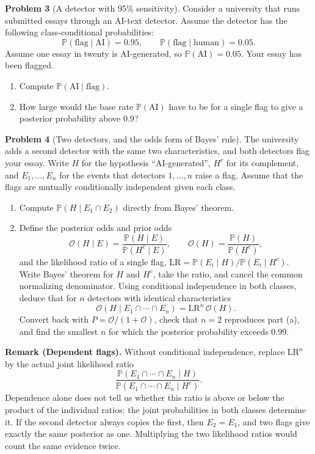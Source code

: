 \documentclass[11pt,a4paper]{article}
\newcommand{\Prob}{\mathbb P}
\newcommand{\problem}[2]{\par\addvspace{6pt}\textbf{Problem #1} (#2). }
\begin{document}
\problem{3}{A detector with 95\% sensitivity}
Consider a university that runs submitted essays through an AI-text
detector. Assume the detector has the following class-conditional probabilities:
\[
\Prob(\text{flag}\mid\text{AI})=0.95,\qquad
\Prob(\text{flag}\mid\text{human})=0.05.
\]
Assume one essay in twenty is AI-generated, so \(\Prob(\text{AI})=0.05\).
Your essay has been flagged.
\begin{enumerate}
\item Compute \(\Prob(\text{AI}\mid\text{flag})\).
\item How large would the base rate \(\Prob(\text{AI})\) have to be for
a single flag to give a posterior probability above \(0.9\)?
\end{enumerate}

\problem{4}{Two detectors, and the odds form of Bayes' rule}
The university adds a second detector with the same two characteristics,
and both detectors flag your essay. Write \(H\) for the hypothesis
``AI-generated'', \(H^c\) for its complement, and \(E_1,\ldots,E_n\) for
the events that detectors \(1,\ldots,n\) raise a flag. Assume that the
flags are mutually conditionally independent given each class.
\begin{enumerate}
\item Compute \(\Prob(H\mid E_1\cap E_2)\) directly from Bayes' theorem.
\item Define the posterior odds and prior odds
\[
\mathcal O(H\mid E)=\frac{\Prob(H\mid E)}{\Prob(H^c\mid E)},
\qquad \mathcal O(H)=\frac{\Prob(H)}{\Prob(H^c)},
\]
and the likelihood ratio of a single flag,
\(\mathrm{LR}=\Prob(E_i\mid H)/\Prob(E_i\mid H^c)\).
Write Bayes' theorem for \(H\) and \(H^c\), take the ratio, and cancel
the common normalizing denominator. Using conditional independence in
both classes, deduce that for \(n\) detectors with identical characteristics
\[
\mathcal O(H\mid E_1\cap\cdots\cap E_n)
=\mathrm{LR}^{n}\,\mathcal O(H).
\]
Convert back with \(P=\mathcal O/(1+\mathcal O)\), check that \(n=2\)
reproduces part (a), and find the smallest \(n\) for which the posterior
probability exceeds \(0.99\).
\end{enumerate}
\textbf{Remark (Dependent flags).} Without conditional independence,
replace \(\mathrm{LR}^{n}\) by the actual joint likelihood ratio
\[
\frac{\Prob(E_1\cap\cdots\cap E_n\mid H)}
     {\Prob(E_1\cap\cdots\cap E_n\mid H^c)}.
\]
Dependence alone does not tell us whether this ratio is above or below
the product of the individual ratios: the joint probabilities in both
classes determine it. If the second detector always copies the first,
then \(E_2=E_1\), and two flags give exactly the same posterior as one.
Multiplying the two likelihood ratios would count the same evidence twice.
\end{document}
